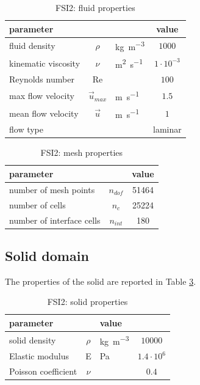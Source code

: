 \begin{table}[!htb]
	\begin{center}
		\begin{tabular}{ l c l | c } 
			parameter & & & value  \\ 
			\hline
			fluid density  & $\rho$ & \si{kg.m^{-3}} & $1000$   \\
			kinematic viscosity & $\nu$& \si{m^{2}.s^{-1}} & $1 \cdot 10^{-3}$  \\
			Reynolds number & Re &  & $100$ \\
			max flow velocity & $\vec{u}_{max}$ & \si{m.s^{-1}} & $1.5$ \\
			mean flow velocity & $\vec{u}$ & \si{m.s^{-1}} & $1$ \\
			flow type & & & laminar \\
		\end{tabular}
	\end{center}
	\caption{FSI2: fluid properties}
	\label{table:FSI2-fluid}
\end{table}



\begin{table}[!htb]
	\begin{center}
		\begin{tabular}{ l c | c } 
			parameter & & value   \\ 
			\hline
			number of mesh points  & $n_{dof}$ & 51464     \\
			number of cells & $n_c$ & 25224  \\
			number of interface cells  & $n_{int}$ & 180  \\			
		\end{tabular}
	\end{center}
	\caption{FSI2: mesh properties}
	\label{table:FSI2-mesh}
\end{table}


\subsection{Solid domain}

The properties of the solid are reported in Table \ref{table:FSI2-solid}.

\begin{table}[!htb]
	\begin{center}
		\begin{tabular}{ l c  l | c } 
			parameter & & value &    \\ 
			\hline
			solid density  & $\rho$ & \si{kg.m^{-3}} & $10000$    \\
			Elastic modulus  & E & \si{Pa} & $1.4\cdot 10^6$    \\
			Poisson coefficient & $\nu$ & & $0.4$  \\
		\end{tabular}
	\end{center}
	\caption{FSI2: solid properties}
	\label{table:FSI2-solid}
\end{table}

